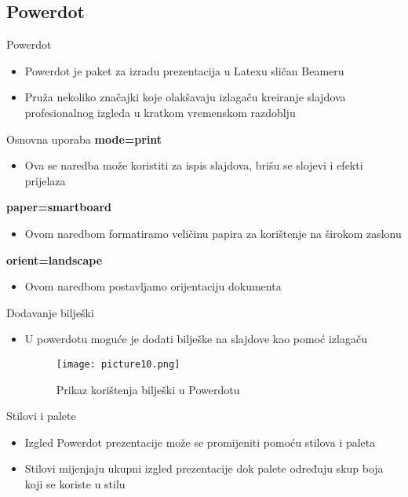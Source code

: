\documentclass{beamer}
\begin{document}
\subsection{Powerdot}

\begin{frame}{Powerdot}
  		\begin{itemize}
  			\item Powerdot je paket za izradu prezentacija u  Latexu sličan Beameru
  			\item Pruža nekoliko značajki koje olakšavaju izlagaču kreiranje slajdova profesionalnog izgleda u kratkom vremenskom razdoblju
  		\end{itemize}
 \end{frame}

 \begin{frame}{Osnovna uporaba}
 \textbf{mode=print}
 		\begin{itemize}
  	  		\item Ova se naredba može koristiti za ispis slajdova, brišu se slojevi i efekti prijelaza
 		\end{itemize}
 \textbf{paper=smartboard}
 		\begin{itemize}
     			\item Ovom naredbom formatiramo veličinu papira za korištenje na širokom zaslonu 
 		\end{itemize}
 \textbf{orient=landscape}
 		\begin{itemize}
     			\item Ovom naredbom postavljamo orijentaciju dokumenta
 		\end{itemize}
 \end{frame}

 \begin{frame}{Dodavanje bilješki}
 		\begin{itemize}
     			\item U powerdotu moguće je dodati bilješke na slajdove kao pomoć izlagaču
 		\begin{figure}
 			\texttt{[image: picture10.png]}
 			\caption{Prikaz korištenja bilješki u Powerdotu}
 		\end{figure}
 		\end{itemize}
 \end{frame}

 \begin{frame}{Stilovi i palete}
 		\begin{itemize}
    			\item Izgled Powerdot prezentacije može se promijeniti pomoću stilova i paleta
     			\item Stilovi mijenjaju ukupni izgled prezentacije dok palete određuju skup boja koji se koriste u stilu
 		\end{itemize}
 \end{frame}
\end{document}
